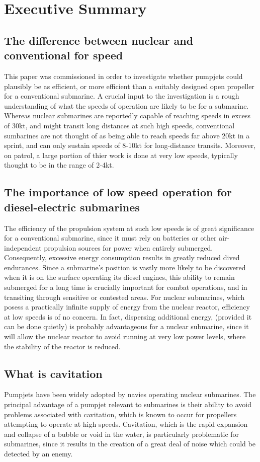 \documentclass{article}\usepackage[]{graphicx}\usepackage[]{color}
\begin{document}
\section{Executive Summary}

\subsection{The difference between nuclear and conventional for speed}
This paper was commissioned in order to investigate whether pumpjets could plausibly be as efficient, or more efficient than a suitably designed open propeller for a conventional submarine. A crucial input to the investigation is a rough understanding of what the speeds of operation are likely to be for a submarine.  Whereas nuclear submarines are reportedly capable of reaching speeds in excess of 30kt, and might transit long distances at such high speeds, conventional sumbarines are not thought of as being able to reach speeds far above 20kt in a sprint, and can only sustain speeds of 8-10kt for long-distance transits.  Moreover, on patrol, a large portion of thier work is done at very low speeds, typically thought to be in the range of 2-4kt.

\subsection{The importance of low speed operation for diesel-electric submarines}
The efficiency of the propulsion system at such low speeds is of great significance for a conventional submarine, since it must rely on batteries or other air-independent propulsion sources for power when entirely submerged.  Consequently, excessive energy consumption results in greatly reduced dived endurances.  Since a submarine's position is vastly more likely to be discovered when it is on the surface operating its diesel engines, this ability to remain submerged for a long time is crucially important for combat operations, and in transiting through sensitive or contested areas.  For nuclear submarines, which posess a practically infinite supply of energy from the nuclear reactor, efficiency at low speeds is of no concern.  In fact, dispersing additional energy, (provided it can be done quietly) is probably advantageous for a nuclear submarine, since it will allow the nuclear reactor to avoid running at very low power levels, where the stability of the reactor is reduced.

\subsection{What is cavitation}
Pumpjets have been widely adopted by navies operating nuclear submarines.  The principal advantage of a pumpjet relevant to submarines is their ability to avoid problems associated with cavitation, which is known to occur for propellers attempting to operate at high speeds.  Cavitation, which is the rapid expansion and collapse of a bubble or void in the water, is particularly problematic for submarines, since it results in the creation of a great deal of noise which could be detected by an enemy.
\end{document}
